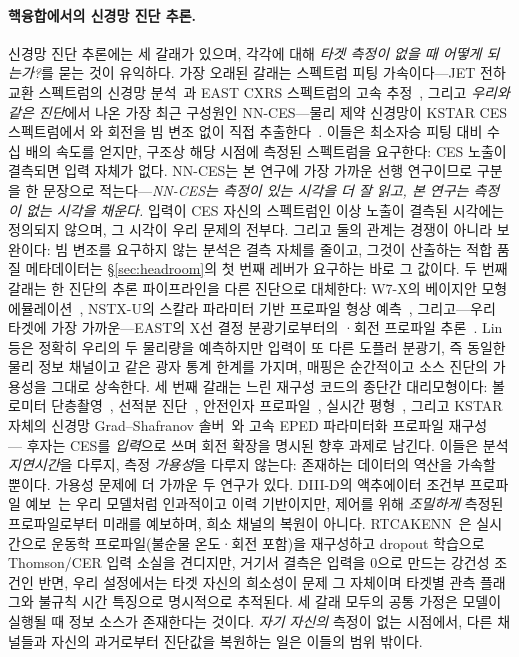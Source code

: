 \documentclass[10pt,a4paper]{article}
\begin{document}
\paragraph{핵융합에서의 신경망 진단 추론.}
신경망 진단 추론에는 세 갈래가 있으며, 각각에 대해 \emph{타겟 측정이 없을 때
어떻게 되는가?}를 묻는 것이 유익하다. 가장 오래된 갈래는 스펙트럼 피팅
가속이다---JET 전하교환 스펙트럼의 신경망
분석~\citep{Bishop1993AutomaticAnalysis,Svensson1999AnalysisJet}과 EAST CXRS
스펙트럼의 고속 \Ti{} 추정~\citep{Chai2019FastEstimation}, 그리고
\emph{우리와 같은 진단}에서 나온 가장 최근 구성원인 NN-CES---물리 제약 신경망이
KSTAR CES 스펙트럼에서 \Ti{}와 회전을 빔 변조 없이 직접
추출한다~\citep{Lee2026NeuralNetworkbased}. 이들은 최소자승 피팅 대비 수십 배의
속도를 얻지만, 구조상 해당 시점에 측정된 스펙트럼을 요구한다: CES 노출이
결측되면 입력 자체가 없다. NN-CES는 본 연구에 가장 가까운 선행 연구이므로 구분을
한 문장으로 적는다---\emph{NN-CES는 측정이 있는 시각을 더 잘 읽고, 본 연구는
측정이 없는 시각을 채운다.} 입력이 CES 자신의 스펙트럼인 이상 노출이 결측된
시각에는 정의되지 않으며, 그 시각이 우리 문제의 전부다. 그리고 둘의 관계는
경쟁이 아니라 보완이다: 빔 변조를 요구하지 않는 분석은 결측 자체를 줄이고, 그것이
산출하는 적합 품질 메타데이터는 \S\ref{sec:headroom}의 첫 번째 레버가 요구하는
바로 그 값이다. 두 번째 갈래는 한 진단의 추론
파이프라인을 다른 진단으로 대체한다: W7-X의 베이지안 모형
에뮬레이션~\citep{Pavone2019NeuralNetwork}, NSTX-U의 스칼라 파라미터 기반
프로파일 형상 예측~\citep{Boyer2021PredictionElectron}, 그리고---우리 타겟에
가장 가까운---EAST의 X선 결정 분광기로부터의 \Ti{}·회전 프로파일
추론~\citep{Lin2024PredictionPlasma}. Lin 등은 정확히 우리의 두 물리량을
예측하지만 입력이 또 다른 도플러 분광기, 즉 동일한 물리 정보 채널이고 같은
광자 통계 한계를 가지며, 매핑은 순간적이고 소스 진단의 가용성을 그대로
상속한다. 세 번째 갈래는 느린 재구성 코드의 종단간 대리모형이다: 볼로미터
단층촬영~\citep{Matos2016DeepLearning}, 선적분
진단~\citep{Wang2025PhysicsinformedDeep}, 안전인자
프로파일~\citep{Wei2023ReconstructionTokamak}, 실시간
평형~\citep{Zheng2024RealtimeEquilibrium}, 그리고 KSTAR 자체의 신경망
Grad--Shafranov 솔버~\citep{Joung2020DeepNeural,Joung2023GsdeepnetMastering}와
고속 EPED 파라미터화 프로파일
재구성~\citep{Jung2026MachineLearningbased} --- 후자는 CES를 \emph{입력}으로
쓰며 회전 확장을 명시된 향후 과제로 남긴다. 이들은 분석 \emph{지연시간}을
다루지, 측정 \emph{가용성}을 다루지 않는다: 존재하는 데이터의 역산을 가속할
뿐이다. 가용성 문제에 더 가까운 두 연구가 있다. DIII-D의 액추에이터 조건부
프로파일 예보~\citep{Abbate2021DatadrivenProfile}는 우리 모델처럼 인과적이고
이력 기반이지만, 제어를 위해 \emph{조밀하게} 측정된 프로파일로부터 미래를
예보하며, 희소 채널의 복원이 아니다.
RTCAKENN~\citep{Shousha2023MachineLearningbased}은 실시간으로 운동학
프로파일(불순물 온도·회전 포함)을 재구성하고 dropout 학습으로 Thomson/CER
입력 소실을 견디지만, 거기서 결측은 입력을 0으로 만드는 강건성 조건인 반면,
우리 설정에서는 타겟 자신의 희소성이 문제 그 자체이며 타겟별 관측 플래그와
불규칙 시간 특징으로 명시적으로 추적된다. 세 갈래 모두의 공통 가정은 모델이
실행될 때 정보 소스가 존재한다는 것이다. \emph{자기 자신의} 측정이 없는
시점에서, 다른 채널들과 자신의 과거로부터 진단값을 복원하는 일은 이들의 범위
밖이다.
\end{document}
